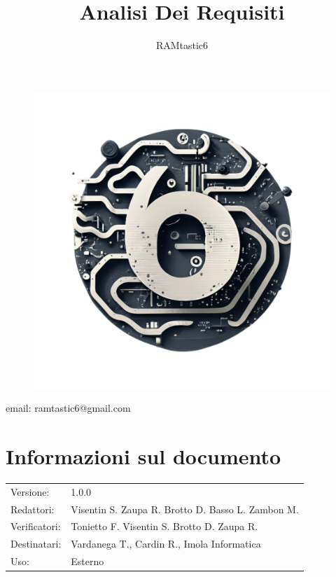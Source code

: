 \documentclass[12pt, oneside]{article}
\author{RAMtastic6}
\begin{document}
\thispagestyle{empty}
\title{Analisi Dei Requisiti}
\maketitle
\begin{figure}[h]
  \centering
  \includegraphics[scale=0.3]{logo.png}
\end{figure}
\begin{center}
    email: ramtastic6@gmail.com
\end{center}

\section*{Informazioni sul documento} 
\begin{tabular}{ll}
Versione: & 1.0.0 \\
Redattori: &  Visentin S.  Zaupa R. Brotto D. Basso L. Zambon M. \\ 
Verificatori: & Tonietto F. Visentin S. Brotto D. Zaupa R.\\
Destinatari: & Vardanega T., Cardin R., Imola Informatica \\
Uso: & Esterno
\end{tabular}
\newpage

\end{document}

